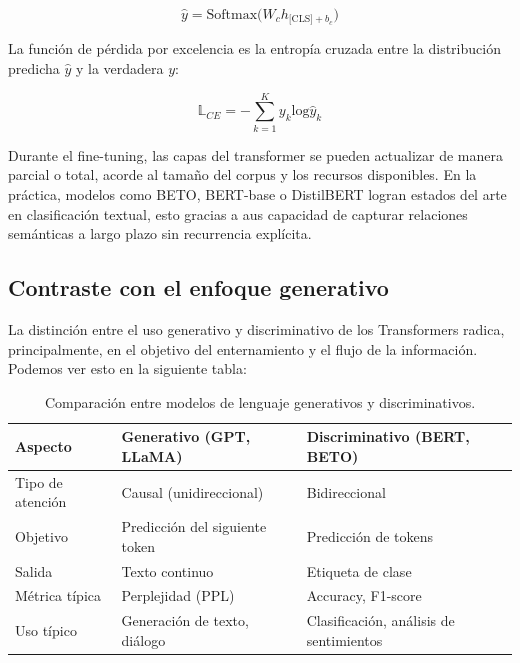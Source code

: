 \[
    \hat{y} = \text{Softmax} \big(W_c h_{\text{[CLS]} + b_c}\big)
\]

La función de pérdida por excelencia es la entropía cruzada entre la distribución predicha $\hat{y}$ 
y la verdadera $y$:

\[
    \mathbb{L}_{CE} = - \sum_{k=1}^{K} y_k \text{log} \hat{y}_k
\]

Durante el fine-tuning, las capas del transformer se pueden actualizar de manera parcial o total, acorde
al tamaño del corpus y los recursos disponibles. En la práctica, modelos como BETO, BERT-base o DistilBERT 
logran estados del arte en clasificación textual, esto gracias a aus capacidad de capturar relaciones semánticas
a largo plazo sin recurrencia explícita. 

\subsection{Contraste con el enfoque generativo}

La distinción entre el uso generativo y discriminativo de los Transformers radica, principalmente,
en el objetivo del enternamiento y el flujo de la información. Podemos ver esto en la siguiente tabla:

\begin{table}[h!]
    \centering
    \caption{Comparación entre modelos de lenguaje generativos y discriminativos.}
    \label{tab:model_comparison}
        \begin{tabular}{lll}
        \toprule
        \textbf{Aspecto} & \textbf{Generativo (GPT, LLaMA)}        & \textbf{Discriminativo (BERT, BETO)}             \\ \midrule
        Tipo de atención & Causal (unidireccional)                 & Bidireccional                                    \\
        Objetivo         & Predicción del siguiente token          & Predicción de tokens    \\
        Salida           & Texto continuo                          & Etiqueta de clase                                \\
        Métrica típica   & Perplejidad (PPL)                       & Accuracy, F1-score                               \\
        Uso típico       & Generación de texto, diálogo            & Clasificación, análisis de sentimientos          \\ \bottomrule
        \end{tabular}
\end{table}


